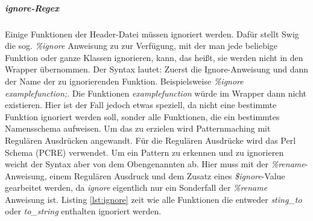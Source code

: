 \subparagraph{ignore-Regex}
Einige Funktionen der Header-Datei müssen ignoriert werden. Dafür stellt Swig die sog. \emph{\%ignore} Anweisung zu zur Verfügung, mit der man jede beliebige Funktion oder ganze Klassen ignorieren, kann, das heißt, sie werden nicht in den Wrapper übernommen. Der Syntax lautet: Zuerst die Ignore-Anweisung und dann der Name der zu ignorierenden Funktion. Beispielsweise \emph{\%ignore examplefunction;}. Die Funktionen \emph{examplefunction} würde im Wrapper dann nicht existieren. Hier ist der Fall jedoch etwas speziell, da nicht eine bestimmte Funktion ignoriert werden soll, sonder alle Funktionen, die ein bestimmtes Namensschema aufweisen. Um das zu erzielen wird Patternmaching mit Regulären Ausdrücken angewandt. Für die Regulären Ausdrücke wird das Perl Schema (PCRE) verwendet. Um ein Pattern zu erkennen und zu ignorieren weicht der Syntax aber von dem Obengenannten ab. Hier muss mit der \emph{\%rename}-Anweisung, einem Regulären Ausdruck und dem Zusatz eines \emph{\$ignore}-Value gearbeitet werden, da \emph{ignore} eigentlich nur ein Sonderfall der \emph{\%rename} Anweisung ist.
Listing \ref{lst:ignore} zeit wie alle Funktionen die entweder \emph{sting\_to} oder \emph{to\_string} enthalten ignoriert werden.

\begin{code}[caption={inoreregex},label={lst:ignore}, escapechar=|]
\end{code}

